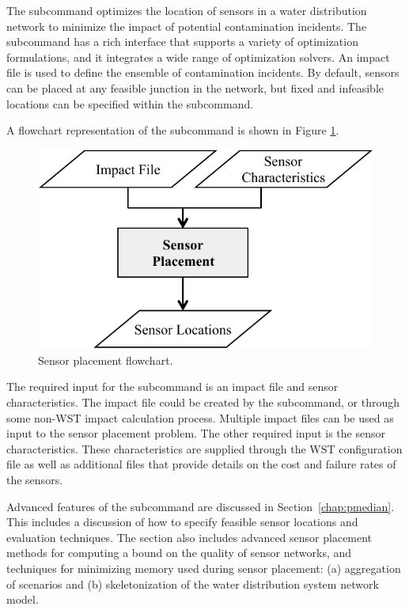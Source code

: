 The  subcommand optimizes the location of sensors in a
water distribution network to minimize the impact of potential
contamination incidents. The  subcommand has a rich interface
that supports a variety of optimization formulations, and it 
integrates a wide range of optimization solvers. 
An impact file is used to define the ensemble of contamination
incidents. By default, sensors can be placed at any feasible junction in
the network, but fixed and infeasible locations can be 
specified within the  subcommand. 

A flowchart representation of the  subcommand is shown in Figure \ref{fig:sp-flowchart}. 

\begin{figure}[h!]
  \centering
  \includegraphics[scale=0.80]{graphics/sp_flowchart.pdf}
  \caption{Sensor placement flowchart.}
  \label{fig:sp-flowchart}
\end{figure}

The required input for the  subcommand is an impact file and 
sensor characteristics. The impact file could be created by the  subcommand,
or through some non-WST impact calculation process.
Multiple impact files can be used as input to the sensor placement problem. The other
required input is the sensor characteristics. These characteristics are supplied through
the  WST configuration file as well as additional files that provide details 
on the cost and failure rates of the sensors.

Advanced features of the  subcommand are discussed in
Section~\ref{chap:pmedian}. This includes a discussion of how to specify
feasible sensor locations and evaluation techniques. The section
also includes advanced sensor placement methods for computing a
bound on the quality of sensor networks, and techniques for minimizing
memory used during sensor placement: (a) aggregation of scenarios
and (b) skeletonization of the water distribution system network
model.



